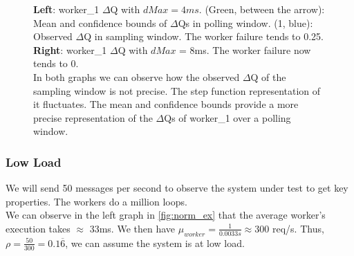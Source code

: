 \begin{figure}[H]
\begin{subfigure}{.5\textwidth}
                \label{fig:w18}
            \end{subfigure}
            \caption{\textbf{Left}: worker\_1 $\Delta$Q with $dMax = 4ms$. (Green, between the arrow): Mean and confidence bounds of $\Delta$Qs in polling window. (1, blue): Observed $\Delta$Q in sampling window. The worker failure tends to 0.25. \\
            \textbf{Right}: worker\_1 $\Delta$Q with $dMax$ = 8ms. The worker failure now tends to 0. \\
            In both graphs we can observe how the observed $\Delta$Q of the sampling window is not precise. The step function representation of it fluctuates. The mean and confidence bounds provide a more precise representation of the $\Delta$Qs of worker\_1 over a polling window.}%
            \label{fig:w1w2hb}
            \end{figure}

    \subsubsection{Low Load} 
   We will send 50 messages per second to observe the system under test to get key properties. The workers do a million loops. \\
    We can observe in the left graph in \cref{fig:norm_ex} that the average worker's execution takes $\approx$ 33ms. We then have $\mu_{worker} = \frac{1}{0.0033 s} \approx 300$ req/s. Thus, $\rho = \frac{50}{300} = 0.1\overline{6}$, we can assume the system is at low load.

